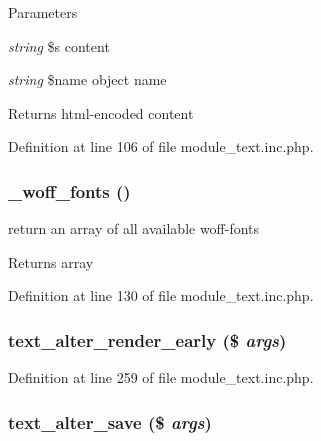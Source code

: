 \begin{DoxyParams}{Parameters}
\item[{\em string}]\$s content \item[{\em string}]\$name object name \end{DoxyParams}
\begin{DoxyReturn}{Returns}
html-\/encoded content 
\end{DoxyReturn}


Definition at line 106 of file module\_\-text.inc.php.

\hypertarget{module__text_8inc_8php_a579e502fadfb1146d8470c8f409916fd}{
\subsubsection[{\_\-woff\_\-fonts}]{\setlength{\rightskip}{0pt plus 5cm}\_\-woff\_\-fonts ()}}
\label{module__text_8inc_8php_a579e502fadfb1146d8470c8f409916fd}
return an array of all available woff-\/fonts

\begin{DoxyReturn}{Returns}
array 
\end{DoxyReturn}


Definition at line 130 of file module\_\-text.inc.php.

\hypertarget{module__text_8inc_8php_ac57835ba072c7df9367b2c277d2f5bd7}{
\subsubsection[{text\_\-alter\_\-render\_\-early}]{\setlength{\rightskip}{0pt plus 5cm}text\_\-alter\_\-render\_\-early (\$ {\em args})}}
\label{module__text_8inc_8php_ac57835ba072c7df9367b2c277d2f5bd7}


Definition at line 259 of file module\_\-text.inc.php.

\hypertarget{module__text_8inc_8php_aaee0a89ba2b213f761b05ca2d6460910}{
\subsubsection[{text\_\-alter\_\-save}]{\setlength{\rightskip}{0pt plus 5cm}text\_\-alter\_\-save (\$ {\em args})}}
\label{module__text_8inc_8php_aaee0a89ba2b213f761b05ca2d6460910}


